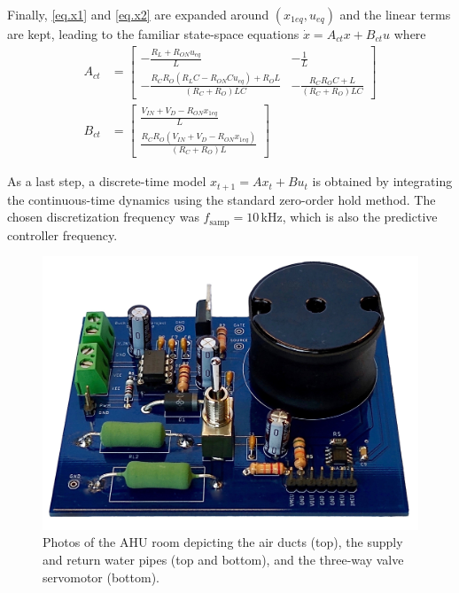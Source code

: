 Finally, \eqref{eq.x1} and \eqref{eq.x2} are expanded around $(x_{1eq},u_{eq})$ and the linear terms are kept, leading to the familiar state-space equations
$\dot{x} = A_{ct} x + B_{ct} u$ where
\begin{align}
	A_{ct} & = \begin{bmatrix} 
		-\frac{R_L+R_{ON} u_{eq}}{L} & -\frac{1}{L} \\[5pt]
		-\frac{R_C R_O (R_L C - R_{ON} C u_{eq}) + R_O L}{(R_C + R_O) L C} & -\frac{R_C R_O C + L}{(R_C+R_O) L C}
	\end{bmatrix} 
	\\[5pt]
	B_{ct} & = \begin{bmatrix} 
		\frac{V_{IN} + V_D - R_{ON} x_{1eq}}{L} \\[5pt]
		\frac{R_C R_O(V_{IN}+V_D-R_{ON}x_{1eq})}{(R_C+R_O)L}
	\end{bmatrix}
\end{align}

As a last step, a discrete-time model $x_{t+1} = A x_{t} + B u_{t}$ is obtained by integrating the continuous-time dynamics using the standard zero-order hold method. The chosen discretization frequency was $f_{\text{samp}} = 10\,$kHz, which is also the predictive controller frequency. 

\begin{figure}[!t]
	\centering
	\includegraphics[width=0.7\linewidth]{../images/chap4_buck}
	\caption{Photos of the AHU room depicting the air ducts (top), the supply and return water pipes (top and bottom), and the three-way valve servomotor (bottom).}
	\label{fig.asd}
\end{figure}


